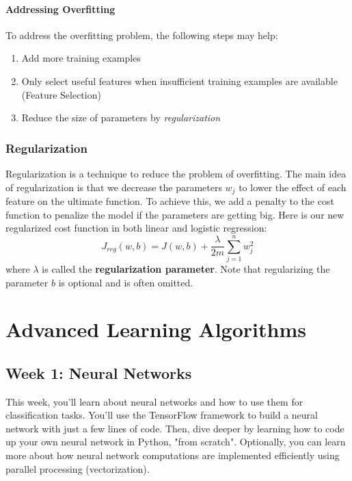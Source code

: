 \documentclass[a4paper, 12pt]{book}
\begin{document}
\subsubsection{Addressing Overfitting}
To address the overfitting problem, the following steps may help:
\begin{enumerate}
    \item Add more training examples
    \item Only select useful features when insufficient training examples are available (Feature Selection)
    \item Reduce the size of parameters by \emph{regularization}
\end{enumerate}

\subsection{Regularization}
Regularization is a technique to reduce the problem of overfitting. The main idea of regularization is that we decrease the parameters $w_j$ to lower the effect of each feature on the ultimate function. To achieve this, we add a penalty to the cost function to penalize the model if the parameters are getting big. Here is our new regularized cost function in both linear and logistic regression: \[J_{reg}(w,b) = J(w,b) + \frac{\lambda}{2m} \sum_{j=1}^{n} w_j^2\] where $\lambda$ is called the \textbf{regularization parameter}. Note that regularizing the parameter $b$ is optional and is often omitted.

\chapter{Advanced Learning Algorithms}
\section{Week 1: Neural Networks}
This week, you'll learn about neural networks and how to use them for classification tasks. You'll use the TensorFlow framework to build a neural network with just a few lines of code. Then, dive deeper by learning how to code up your own neural network in Python, "from scratch". Optionally, you can learn more about how neural network computations are implemented efficiently using parallel processing (vectorization).
\end{document}
